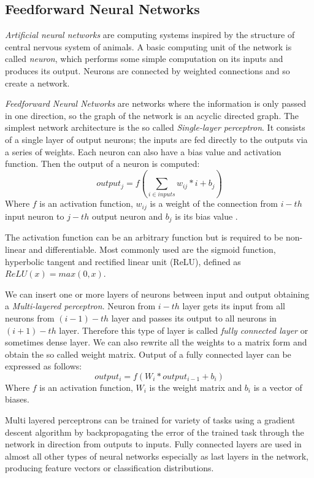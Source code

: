 \subsection{Feedforward Neural Networks}
\textit{Artificial neural networks} are computing systems inspired by the structure of central nervous system of animals. A basic computing unit of the network is called \textit{neuron}, which performs some simple computation on its inputs and produces its output. Neurons are connected by weighted connections and so create a network. \par
\textit{Feedforward Neural Networks} are networks where the information is only passed in one direction, so the graph of the network is an acyclic directed graph. The simplest network architecture is the so called \textit{Single-layer perceptron}. It consists of a single layer of output neurons; the inputs are fed directly to the outputs via a series of weights. Each neuron can also have a bias value and activation function. Then the output of a neuron is computed: $$output_j = f(\sum_{i \in inputs} {w_{ij}*i + b_j})$$ Where $f$ is an activation function, $w_{ij}$ is a weight of the connection from $i-th$ input neuron to $j-th$ output neuron and $b_j$ is its bias value .

The activation function can be an arbitrary function but is required to be non-linear and differentiable. Most commonly used are the sigmoid function, hyperbolic tangent and rectified linear unit (ReLU), defined as $ReLU(x) = max(0,x)$.\par  
We can insert one or more layers of neurons between input and output obtaining a \textit{Multi-layered perceptron}. Neuron from $i-th$ layer gets its input from all neurons from $(i-1)-th$ layer and passes its output to all neurons in $(i+1)-th$ layer. Therefore this type of layer is called \textit{fully connected layer} or sometimes dense layer.  We can also rewrite all the weights to a matrix form and obtain the so called weight matrix. Output of a fully connected layer can be expressed as follows: 
$$output_i = f(W_i * output_{i-1} + b_i)$$
Where $f$ is an activation function, $W_i$ is the weight matrix and $b_i$ is a vector of biases.\par  
Multi layered perceptrons can be trained for variety of tasks using a gradient descent algorithm by backpropagating the error of the trained task through the network in direction from outputs to inputs. Fully connected layers are used in almost all other types of neural networks especially as last layers in the network, producing feature vectors or classification distributions.


